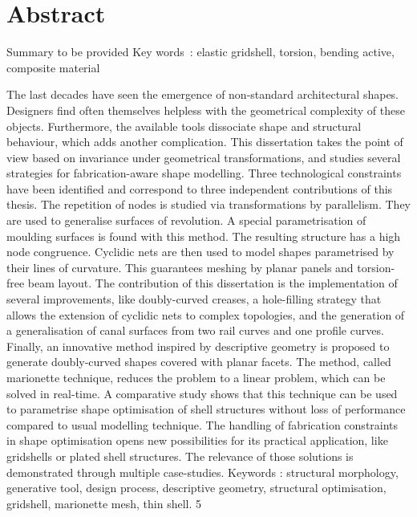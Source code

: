 
\cleardoublepage
\chapter*{Abstract}
Summary to be provided
\vskip0.5cm
Key words~: elastic gridshell, torsion, bending active, composite material


The last decades have seen the emergence of non-standard architectural shapes. Designers find often themselves helpless with the geometrical complexity of these objects. Furthermore, the available tools dissociate shape and structural behaviour, which adds another complication. This dissertation takes the point of view based on invariance under geometrical transformations, and studies several strategies for fabrication-aware shape modelling. Three technological constraints have been identified and correspond to three independent contributions of this thesis. The repetition of nodes is studied via transformations by parallelism. They are used to generalise
surfaces of revolution. A special parametrisation of moulding surfaces is found with this method. The resulting structure has a high node congruence. Cyclidic nets are then used to model shapes parametrised by their lines of curvature. This guarantees
meshing by planar panels and torsion-free beam layout. The contribution of this dissertation is the implementation of several improvements, like doubly-curved creases, a hole-filling strategy that allows the extension of cyclidic nets to complex topologies, and the generation of a generalisation of canal surfaces from two rail curves and one profile curves. Finally, an innovative method inspired by descriptive geometry is proposed to generate doubly-curved
shapes covered with planar facets. The method, called marionette technique, reduces the problem to a linear problem, which can be solved in real-time. A comparative study shows that this technique can be used to parametrise shape optimisation of shell structures without loss of performance compared to usual modelling technique. The handling of fabrication constraints in shape optimisation opens new possibilities for its practical application, like gridshells or plated shell structures. The relevance of those solutions is demonstrated through multiple case-studies.
Keywords : structural morphology, generative tool, design process, descriptive geometry, structural optimisation, gridshell, marionette mesh, thin shell.
5

